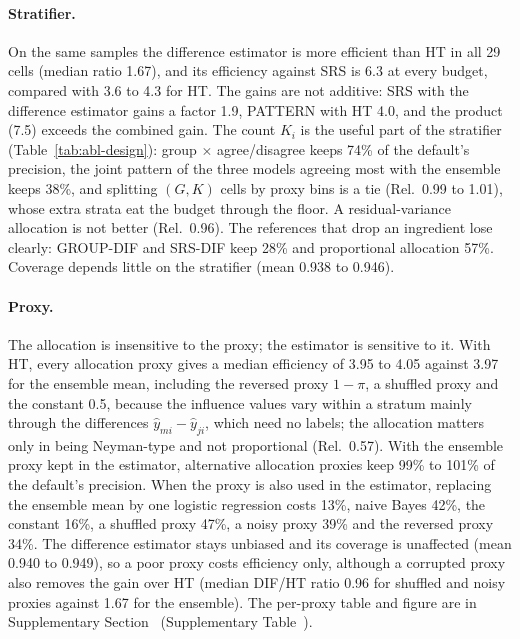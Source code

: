 \paragraph{Stratifier.} On the same samples the difference estimator is more efficient than HT in all 29 cells (median ratio 1.67), and its efficiency against SRS is 6.3 at every budget, compared with 3.6 to 4.3 for HT. The gains are not additive: SRS with the difference estimator gains a factor 1.9, PATTERN with HT 4.0, and the product (7.5) exceeds the combined gain. The count $K_i$ is the useful part of the stratifier (Table~\ref{tab:abl-design}): group $\times$ agree/disagree keeps 74\% of the default's precision, the joint pattern of the three models agreeing most with the ensemble keeps 38\%, and splitting $(G,K)$ cells by proxy bins is a tie (Rel.\ 0.99 to 1.01), whose extra strata eat the budget through the floor. A residual-variance allocation is not better (Rel.\ 0.96). The references that drop an ingredient lose clearly: GROUP-DIF and SRS-DIF keep 28\% and proportional allocation 57\%. Coverage depends little on the stratifier (mean 0.938 to 0.946).

\paragraph{Proxy.} The allocation is insensitive to the proxy; the estimator is sensitive to it. With HT, every allocation proxy gives a median efficiency of 3.95 to 4.05 against 3.97 for the ensemble mean, including the reversed proxy $1-\pi$, a shuffled proxy and the constant 0.5, because the influence values vary within a stratum mainly through the differences $\hat y_{mi}-\hat y_{ji}$, which need no labels; the allocation matters only in being Neyman-type and not proportional (Rel.\ 0.57). With the ensemble proxy kept in the estimator, alternative allocation proxies keep 99\% to 101\% of the default's precision. When the proxy is also used in the estimator, replacing the ensemble mean by one logistic regression costs 13\%, naive Bayes 42\%, the constant 16\%, a shuffled proxy 47\%, a noisy proxy 39\% and the reversed proxy 34\%. The difference estimator stays unbiased and its coverage is unaffected (mean 0.940 to 0.949), so a poor proxy costs efficiency only, although a corrupted proxy also removes the gain over HT (median DIF/HT ratio 0.96 for shuffled and noisy proxies against 1.67 for the ensemble). The per-proxy table and figure are in Supplementary Section~ (Supplementary Table~).

